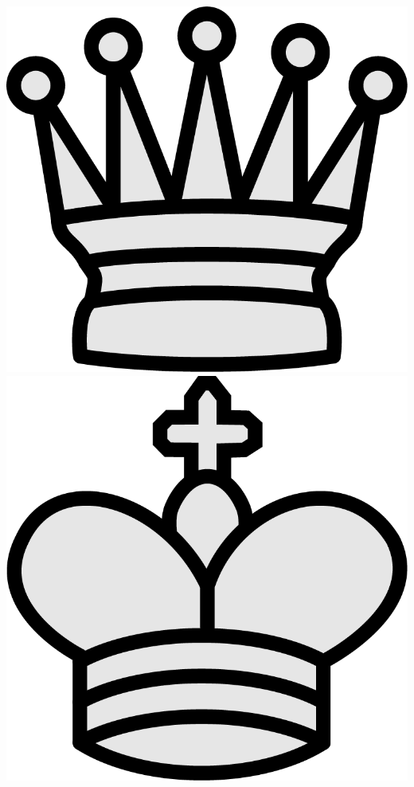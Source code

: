 \documentclass{article}
\begin{document}
\begin{center}
	\includegraphics[scale=0.07]{image4}
	\includegraphics[scale=0.07]{image8}
    \end{center}

    
    
\end{document}

